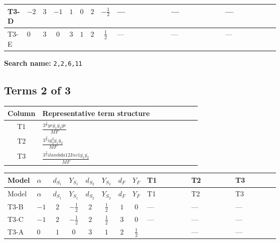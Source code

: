 \documentclass[8pt]{article}
\begin{document}
\begin{landscape}
\begin{longtable}{@{}llcccccc >{\raggedright\arraybackslash}p{0.21\linewidth} >{\raggedright\arraybackslash}p{0.21\linewidth} >{\raggedright\arraybackslash}p{0.21\linewidth}@{}}
\midrule
T3-D & $-2$ & $3$ & $-1$ & $1$ & $0$ & $2$ & $-\frac{1}{2}$ & --- & --- & --- \\
\midrule
T3-E & $0$ & $3$ & $0$ & $3$ & $1$ & $2$ & $\frac{1}{2}$ & --- & --- & --- \\
\midrule
\bottomrule
\end{longtable}
\clearpage
\noindent\textbf{Search name: }\texttt{2,2,6,11}\par\smallskip
\subsection*{Terms 2 of 3}
\begin{center}
\begin{tabular}{@{}c >{\raggedright\arraybackslash}p{0.82\linewidth}@{}}
\toprule
Column & Representative term structure \\
\midrule
T1 & \(\displaystyle \frac{3^{\frac{3}{4}} ye \overline{y_{1}} \overline{y_{2}} \overline{ye}}{MF}\) \\
\midrule
T2 & \(\displaystyle \frac{3^{\frac{3}{4}} i g_{2}^{2} \overline{y_{1}} \overline{y_{2}}}{MF}\) \\
\midrule
T3 & \(\displaystyle \frac{3^{\frac{3}{4}} i lambda12Inv1 \overline{y_{1}} \overline{y_{2}}}{MF}\) \\
\midrule
\bottomrule
\end{tabular}
\end{center}
\smallskip
\tiny
\begin{longtable}{@{}llcccccc >{\raggedright\arraybackslash}p{0.21\linewidth} >{\raggedright\arraybackslash}p{0.21\linewidth} >{\raggedright\arraybackslash}p{0.21\linewidth}@{}}
\toprule
Model & $\alpha$ & $d_{S_1}$ & $Y_{S_1}$ & $d_{S_2}$ & $Y_{S_2}$ & $d_F$ & $Y_F$ & T1 & T2 & T3 \\
\midrule
\endfirsthead
\toprule
Model & $\alpha$ & $d_{S_1}$ & $Y_{S_1}$ & $d_{S_2}$ & $Y_{S_2}$ & $d_F$ & $Y_F$ & T1 & T2 & T3 \\
\midrule
\endhead
T3-B & $-1$ & $2$ & $-\frac{1}{2}$ & $2$ & $\frac{1}{2}$ & $1$ & $0$ & --- & --- & --- \\
\midrule
T3-C & $-1$ & $2$ & $-\frac{1}{2}$ & $2$ & $\frac{1}{2}$ & $3$ & $0$ & --- & --- & --- \\
\midrule
T3-A & $0$ & $1$ & $0$ & $3$ & $1$ & $2$ & $\frac{1}{2}$ & \scriptsize\adjustbox{max width=\linewidth}{$\begin{gathered} \frac{3^{\frac{3}{4}} ye \overline{y_{1}} \overline{y_{2}} \overline{ye}}{12 MF}\end{gathered}$} & --- & --- \\

\end{longtable}
\end{landscape}
\end{document}
